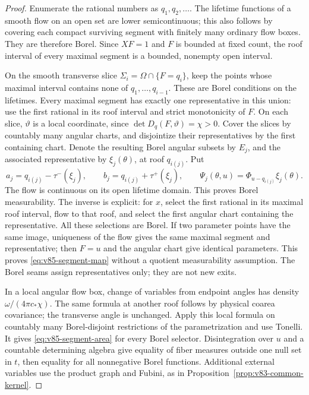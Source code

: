 \begin{proof}
Enumerate the rational numbers as $q_1,q_2,\ldots$. The lifetime
functions of a smooth flow on an open set are lower semicontinuous;
this also follows by covering each compact surviving segment with
finitely many ordinary flow boxes. They are therefore Borel. Since
$XF=1$ and $F$ is bounded at fixed count, the roof interval of every
maximal segment is a bounded, nonempty open interval.

On the smooth transverse slice $\Sigma_i=\Omega\cap\{F=q_i\}$,
keep the points whose maximal interval contains none of
$q_1,\ldots,q_{i-1}$. These are Borel conditions on the lifetimes.
Every maximal segment has exactly one representative in this union:
use the first rational in its roof interval and strict monotonicity of
$F$. On each slice, $\vartheta$ is a local coordinate, since
$\det D_q(F,\vartheta)=\chi>0$. Cover the slices by countably many
angular charts, and disjointize their representatives by the first
containing chart. Denote the resulting Borel angular subsets by $E_j$,
and the associated representative by $\xi_j(\theta)$, at roof $q_{i(j)}$.
Put
\[
 a_j=q_{i(j)}-\tau^-(\xi_j),\qquad
 b_j=q_{i(j)}+\tau^+(\xi_j),\qquad
 \Psi_j(\theta,u)=\Phi_{u-q_{i(j)}}\xi_j(\theta).
\]
The flow is continuous on its open lifetime domain. This proves Borel
measurability. The inverse is explicit: for $x$, select the first
rational in its maximal roof interval, flow to that roof, and select
the first angular chart containing the representative. All these
selections are Borel. If two parameter points have the same image,
uniqueness of the flow gives the same maximal segment and representative;
then $F=u$ and the angular chart give identical parameters. This proves
\eqref{eq:v85-segment-map} without a quotient measurability assumption.
The Borel seams assign representatives only; they are not new exits.

In a local angular flow box, change of variables from endpoint angles
has density $\omega/(4\pi c_*\chi)$. The same formula at another roof
follows by physical coarea covariance; the transverse angle is unchanged.
Apply this local formula on countably many Borel-disjoint restrictions
of the parametrization and use Tonelli. It gives
\eqref{eq:v85-segment-area} for every Borel selector. Disintegration over
$u$ and a countable determining algebra give equality of fiber measures
outside one null set in $t$, then equality for all nonnegative Borel
functions. Additional external variables use the product graph and
Fubini, as in Proposition~\ref{prop:v83-common-kernel}.


\end{proof}
